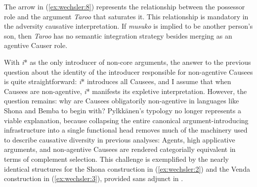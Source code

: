 \documentclass[output=paper,modfonts,nonflat,colorlinks,citecolor=brown]{langsci/langscibook}
\begin{document}
\z
{}



The arrow in (\ref{ex:wechsler:8}) represents the relationship between the possessor role and the argument \textit{Taroo} that saturates it. This relationship is mandatory in the adversity causative interpretation. If \textit{musuko} is implied to be another person’s son, then \textit{Taroo} has no semantic integration strategy besides merging as an agentive Causer role.

With \textit{i}* as the only introducer of non-core arguments, the answer to the previous question about the identity of the introducer responsible for non-agentive Causees is quite straightforward: \textit{i}* introduces all Causees, and I assume that when Causees are non-agentive, \textit{i}* manifests its expletive interpretation. However, the question remains: why are Causees obligatorily non-agentive in languages like Shona and Bemba to begin with? Pylkkänen’s typology no longer represents a viable explanation, because collapsing the entire canonical argument-introducing infrastructure into a single functional head removes much of the machinery used to describe causative diversity in previous analyses: Agents, high applicative arguments, and non-agentive Causees are rendered categorially equivalent in terms of complement selection. This challenge is exemplified by the nearly identical structures for the Shona construction in (\ref{ex:wechsler:2}) and the Venda construction in (\ref{ex:wechsler:3}), provided sans adjunct in .
\end{document}

